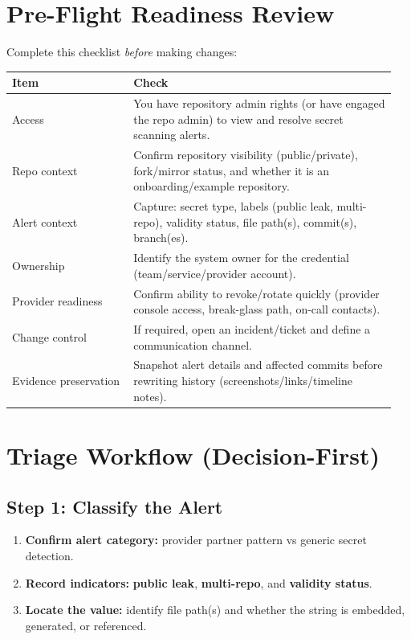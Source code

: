 \documentclass[11pt]{article}
\newcommand{\term}[1]{\textbf{#1}}
\begin{document}
\section{Pre-Flight Readiness Review}
Complete this checklist \emph{before} making changes:
\begin{longtable}{@{}p{0.30\linewidth}p{0.65\linewidth}@{}}
\toprule
\textbf{Item} & \textbf{Check} \\
\midrule
Access & You have repository admin rights (or have engaged the repo admin) to view and resolve secret scanning alerts. \\
Repo context & Confirm repository visibility (public/private), fork/mirror status, and whether it is an onboarding/example repository. \\
Alert context & Capture: secret type, labels (public leak, multi-repo), validity status, file path(s), commit(s), branch(es). \\
Ownership & Identify the system owner for the credential (team/service/provider account). \\
Provider readiness & Confirm ability to revoke/rotate quickly (provider console access, break-glass path, on-call contacts). \\
Change control & If required, open an incident/ticket and define a communication channel. \\
Evidence preservation & Snapshot alert details and affected commits before rewriting history (screenshots/links/timeline notes). \\
\bottomrule
\end{longtable}

\section{Triage Workflow (Decision-First)}
\subsection{Step 1: Classify the Alert}
\begin{enumerate}
  \item \textbf{Confirm alert category:} provider partner pattern vs generic secret detection.
  \item \textbf{Record indicators:} \term{public leak}, \term{multi-repo}, and \term{validity status}.
  \item \textbf{Locate the value:} identify file path(s) and whether the string is embedded, generated, or referenced.
\end{enumerate}
\end{document}
